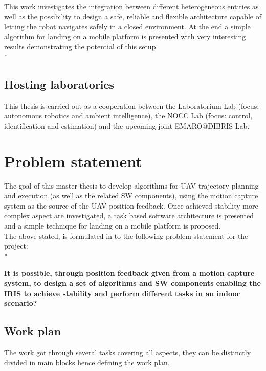 This work investigates the integration between different heterogeneous entities as well as the possibility to design a safe, reliable and flexible architecture capable of letting the robot navigates safely in a closed environment. At the end a simple algorithm for landing on a mobile platform is presented with very interesting results demonstrating the potential of this setup.\\*

\subsection{Hosting laboratories}
This thesis is carried out as a cooperation between the Laboratorium Lab (focus:
autonomous robotics and ambient intelligence), the NOCC Lab (focus: control,
identification and estimation) and the upcoming joint EMARO@DIBRIS Lab.

\newpage

\section{Problem statement}

The goal of this master thesis to develop algorithms for UAV trajectory planning and execution (as well as the related SW components), using the motion capture system as the source of the UAV position feedback. Once achieved stability more complex aspect are investigated, a task based software architecture is presented and a simple technique for landing on a mobile platform is proposed.\\
The above stated, is formulated in to the following problem statement for the project: \\*

\textbf{It is possible, through position feedback given from a motion capture system, to design a set of algorithms and SW components enabling the IRIS to achieve stability and perform different tasks in an indoor scenario? }

\subsection{Work plan}
The work got through several tasks covering all aspects, they can be distinctly divided in main blocks hence defining the work plan.

